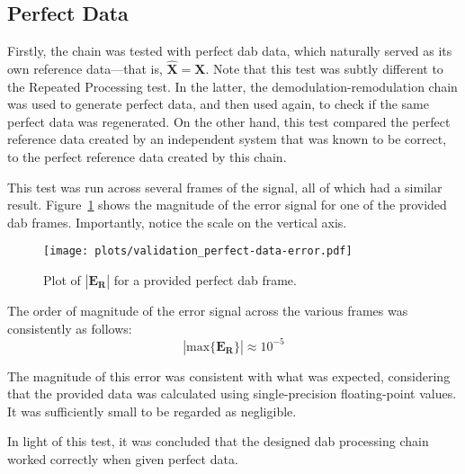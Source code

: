 \documentclass[class=report,11pt,crop=false]{standalone}
\begin{document}
\subsection{Perfect Data}
Firstly, the chain was tested with perfect \gls{dab} data, which naturally served as its own reference data---that is, \(\mathbf{\hat{X}} = \mathbf{X}\). Note that this test was subtly different to the Repeated Processing test. In the latter, the demodulation-remodulation chain was used to generate perfect data, and then used again, to check if the same perfect data was regenerated. On the other hand, this test compared the perfect reference data created by an independent system that was known to be correct, to the perfect reference data created by this chain.

This test was run across several frames of the signal, all of which had a similar result. Figure~\ref{fig:validation_perfect-data-error} shows the magnitude of the error signal for one of the provided \gls{dab} frames. Importantly, notice the scale on the vertical axis.

\begin{figure}
  \centering
  \captionsetup{type=figure}
  \texttt{[image: plots/validation\_perfect-data-error.pdf]}
  \caption{Plot of \(|\mathbf{E_R}|\) for a provided perfect \gls{dab} frame.}
  \label{fig:validation_perfect-data-error}
\end{figure}

The order of magnitude of the error signal across the various frames was consistently as follows:
\begin{equation}
  \left| \mathrm{max} \{ \mathbf{E_R} \} \right| \approx 10^{-5}
\end{equation}

The magnitude of this error was consistent with what was expected, considering that the provided data was calculated using single-precision floating-point values. It was sufficiently small to be regarded as negligible.

In light of this test, it was concluded that the designed \gls{dab} processing chain worked correctly when given perfect data.

\end{document}
